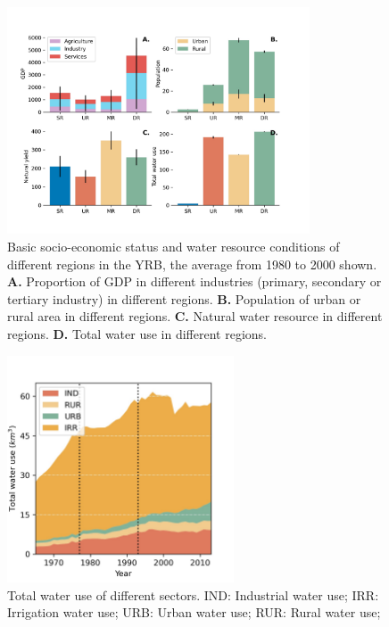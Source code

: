 \documentclass[9pt,twoside,lineno]{pnas-new}
\begin{document}
\begin{figure}
    \centering
    \includegraphics[width=0.8\textwidth]{../../figures/sup/region_differences.jpg}
    \caption{
        Basic socio-economic status and water resource conditions of different regions in the YRB, the average from 1980 to 2000 shown.
        \textbf{A.} Proportion of GDP in different industries (primary, secondary or tertiary industry) in different regions.
        \textbf{B.} Population of urban or rural area in different regions.
        \textbf{C.} Natural water resource in different regions.
        \textbf{D.} Total water use in different regions.
    }
\end{figure}

\begin{figure}
    \centering
    \includegraphics[width=0.6\textwidth]{../../figures/sup/sf_wu_sections_stackplot.jpg}
    \caption{
        Total water use of different sectors.
        IND: Industrial water use;
        IRR: Irrigation water use;
        URB: Urban water use;
        RUR: Rural water use;
    }
\end{figure}
\end{document}
